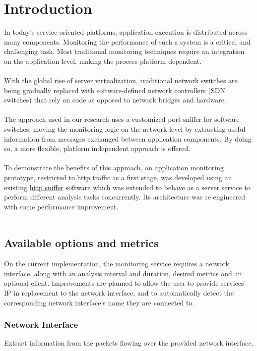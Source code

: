 \documentclass[12pt,hidelinks]{article}
\begin{document}
\section{Introduction}
In today’s service-oriented platforms, application
execution is distributed across many components.
Monitoring the performance of such a system is a
critical and challenging task. Most traditional
monitoring techniques require an integration on the
application level, making the process platform
dependent. \\
\\
With the global rise of server virtualization,
traditional network switches are being gradually
replaced with software-defined network controllers
(SDN switches) that rely on code as opposed to network bridges and hardware.\\
\\
The approach used in our research uses a customized
port sniffer for software switches, moving the
monitoring logic on the network level by extracting
useful information from messages exchanged
between application components. By doing so, a more
flexible, platform independent approach is offered. \\
\\
To demonstrate the benefits of this approach, an
application monitoring prototype, restricted to http
traffic as a first stage, was developed using an
existing \href{http://github.com/caesar0301/http-sniffer}{http sniffer} software which was extended
to behave as a server service to perform different
analysis tasks concurrently. Its architecture was re
engineered with some performance improvement. \\
\\
\subsection{Available options and metrics}

On the current implementation, the monitoring service requires a network interface, along with an analysis interval and duration, desired metrics and an optional client.
Improvements are planned to allow the user to provide services' IP in replacement to the network interface, and to automatically detect the corresponding network interface's name they are connected to.

\subsubsection{Network Interface}
Extract information from the packets flowing over the provided network interface.
\end{document}
